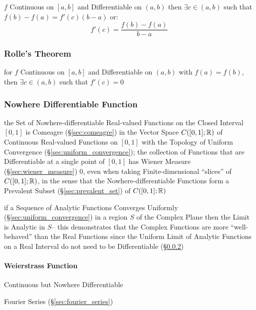 $f$ Continuous on $[a,b]$ and Differentiable on $(a,b)$ then $\exists
c \in (a,b)$ such that $f(b) - f(a) = f'(c)(b-a)$ or:
\[
  f'(c) = \frac{f(b) - f(a)}{b - a}
\]



\subsubsection{Rolle's Theorem}\label{sec:rolles_theorem}

for $f$ Continuous on $[a,b]$ and Differentiable on $(a,b)$ with $f(a)
= f(b)$, then $\exists c \in (a,b)$ such that $f'(c) = 0$



\subsubsection{Nowhere Differentiable Function}
\label{sec:nowhere_differentiable}

the Set of Nowhere-differentiable Real-valued Functions on the Closed Interval
$[0,1]$ is Comeagre (\S\ref{sec:comeagre}) in the Vector Space $C([0,1];
\mathbb{R})$ of Continuous Real-valued Functions on $[0,1]$ with the Topology of
Uniform Convergence (\S\ref{sec:uniform_convergence}); the collection of
Functions that are Differentiable at a single point of $[0,1]$ has Wiener
Measure (\S\ref{sec:wiener_measure}) $0$, even when taking Finite-dimensional
``slices'' of $C([0,1];\mathbb{R})$, in the sense that the Nowhere-differentiable
Functions form a Prevalent Subset (\S\ref{sec:prevalent_set}) of $C([0,1];
\mathbb{R})$

if a Sequence of Analytic Functions Converges Uniformly
(\S\ref{sec:uniform_convergence}) in a region $S$ of the Complex Plane then the
Limit is Analytic in $S$-- this demonstrates that the Complex Functions are
more ``well-behaved'' than the Real Functions since the Uniform Limit of
Analytic Functions on a Real Interval do not need to be Differentiable
(\S\ref{sec:nowhere_differentiable})



\paragraph{Weierstrass Function}\label{sec:weierstrass_function}\hfill

Continuous but Nowhere Differentiable

Fourier Series (\S\ref{sec:fourier_series})



